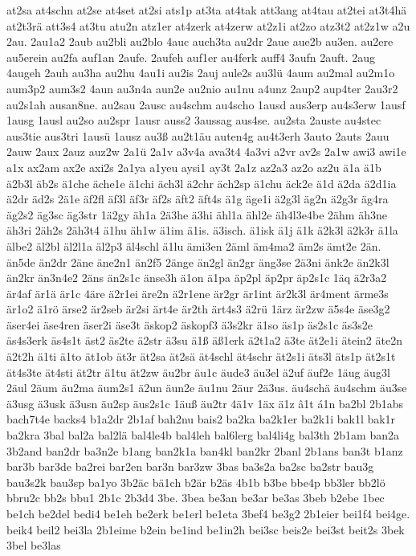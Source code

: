 {at2sa
at4schn
at2se
at4set
at2si
ats1p
at3ta
at4tak
att3ang
at4tau
at2tei
at3t4hä
at2t3rä
att3s4
at3tu
atu2n
atz1er
at4zerk
at4zerw
at2z1i
at2zo
atz3t2
at2z1w
a2u
2au.
2au1a2
2aub
au2bli
au2blo
4auc
auch3ta
au2dr
2aue
aue2b
au3en.
au2ere
au5erein
au2fa
auf1an
2aufe.
2aufeh
auf1er
au4ferk
auff4
3aufn
2auft.
2aug
4augeh
2auh
au3ha
au2hu
4au1i
au2is
2auj
aule2s
au3lü
4aum
au2mal
au2m1o
aum3p2
aum3s2
4aun
au3n4a
aun2e
au2nio
au1nu
a4unz
2aup2
aup4ter
2au3r2
au2s1ah
ausan8ne.
au2sau
2ausc
au4schm
au4scho
1ausd
aus3erp
au4s3erw
1ausf
1ausg
1ausl
au2so
au2spr
1ausr
auss2
3aussag
aus4se.
au2sta
2auste
au4stec
aus3tie
aus3tri
1ausü
1ausz
au3ß
au2t1äu
auten4g
au4t3erh
3auto
2auts
2auu
2auw
2aux
2auz
auz2w
2a1ü
2a1v
a3v4a
ava3t4
4a3vi
a2vr
av2s
2a1w
awi3
awi1e
a1x
ax2am
ax2e
axi2s
2a1ya
a1yeu
aysi1
ay3t
2a1z
az2a3
az2o
az2u
ä1a
ä1b
ä2b3l
äb2s
ä1che
äche1e
ä1chi
äch3l
ä2chr
äch2sp
ä1chu
äck2e
ä1d
ä2da
ä2d1ia
ä2dr
äd2s
2ä1e
äf2fl
äf3l
äf3r
äf2s
äft2
äft4s
ä1g
äge1i
ä2g3l
äg2n
ä2g3r
äg4ra
äg2s2
äg3sc
äg3str
1ä2gy
äh1a
2ä3he
ä3hi
ähl1a
ähl2e
äh4l3e4be
2ähm
äh3ne
äh3ri
2äh2s
2äh3t4
ä1hu
äh1w
ä1im
ä1is.
ä3isch.
ä1isk
ä1j
ä1k
ä2k3l
ä2k3r
ä1la
älbe2
äl2bl
äl2l1a
äl2p3
äl4schl
ä1lu
ämi3en
2äml
äm4ma2
äm2s
ämt2e
2än.
än5de
än2dr
2äne
äne2n1
än2f5
2änge
än2gl
än2gr
äng3se
2ä3ni
änk2e
än2k3l
än2kr
än3n4e2
2äns
än2s1c
änse3h
ä1on
ä1pa
äp2pl
äp2pr
äp2s1c
1äq
ä2r3a2
är4af
är1ä
är1c
4äre
ä2r1ei
äre2n
ä2r1ene
är2gr
är1int
är2k3l
är4ment
ärme3s
är1o2
ä1rö
ärse2
är2seb
är2si
ärt4e
är2th
ärt4s3
ä2rü
1ärz
är2zw
ä5s4e
äse3g2
äser4ei
äse4ren
äser2i
äse3t
äskop2
äskopf3
ä3s2kr
ä1so
äs1p
äs2s1c
äs3s2e
äs4s3erk
äs4s1t
äst2
äs2te
ä2str
ä3su
ä1ß
äß1erk
ä2t1a2
ä3te
ät2e1i
ätein2
äte2n
ä2t2h
ä1ti
ä1to
ät1ob
ät3r
ät2sa
ät2sä
ät4schl
ät4schr
ät2s1i
äts3l
äts1p
ät2s1t
ät4s3te
ät4sti
ät2tr
ä1tu
ät2zw
äu2br
äu1c
äude3
äu3el
ä2uf
äuf2e
1äug
äug3l
2äul
2äum
äu2ma
äum2s1
ä2un
äun2e
äu1nu
2äur
2ä3us.
äu4schä
äu4schm
äu3se
ä3usg
ä3usk
ä3usn
äu2sp
äus2s1c
1äuß
äu2tr
4ä1v
1äx
ä1z
â1t
á1n
ba2bl
2b1abs
bach7t4e
backs4
b1a2dr
2b1af
bah2nu
bais2
ba2ka
ba2k1er
ba2k1i
bak1l
bak1r
ba2kra
3bal
bal2a
bal2lä
bal4le4b
bal4leh
bal6lerg
bal4li4g
bal3th
2b1am
ban2a
3b2and
ban2dr
ba3n2e
b1ang
ban2k1a
ban4kl
ban2kr
2banl
2b1ans
ban3t
b1anz
bar3b
bar3de
ba2rei
bar2en
bar3n
bar3zw
3bas
ba3s2a
ba2sc
ba2str
bau3g
bau3s2k
bau3sp
ba1yo
3b2äc
bä1ch
b2är
b2äs
4b1b
b3be
bbe4p
bb3ler
bb2lö
bbru2c
bb2s
bbu1
2b1c
2b3d4
3be.
3bea
be3an
be3ar
be3as
3beb
b2ebe
1bec
be1ch
be2del
bedi4
be1eh
be2erk
be1erl
be1eta
3bef4
be3g2
2b1eier
bei1f4
bei4ge.
beik4
beil2
bei3la
2b1eime
b2ein
be1ind
be1in2h
bei3sc
beis2e
bei3st
beit2s
3bek
3bel
be3las
}
